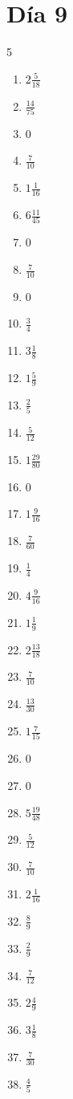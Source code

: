 \documentclass[12pt]{article}
\begin{document}
\section*{Día 9}
\begin{multicols}{5}\begin{enumerate}
\item $ 2 \frac{5}{18} $
\item $ \frac{14}{75} $
\item $ 0 $
\item $ \frac{7}{10} $
\item $ 1 \frac{1}{16} $
\item $ 6 \frac{11}{45} $
\item $ 0 $
\item $ \frac{7}{10} $
\item $ 0 $
\item $ \frac{3}{4} $
\item $ 3 \frac{1}{8} $
\item $ 1 \frac{5}{9} $
\item $ \frac{2}{5} $
\item $ \frac{5}{12} $
\item $ 1 \frac{29}{80} $
\item $ 0 $
\item $ 1 \frac{9}{16} $
\item $ \frac{7}{60} $
\item $ \frac{1}{4} $
\item $ 4 \frac{9}{16} $
\item $ 1 \frac{1}{9} $
\item $ 2 \frac{13}{18} $
\item $ \frac{7}{10} $
\item $ \frac{13}{30} $
\item $ 1 \frac{7}{15} $
\item $ 0 $
\item $ 0 $
\item $ 5 \frac{19}{48} $
\item $ \frac{5}{12} $
\item $ \frac{7}{10} $
\item $ 2 \frac{1}{16} $
\item $ \frac{8}{9} $
\item $ \frac{2}{9} $
\item $ \frac{7}{12} $
\item $ 2 \frac{4}{9} $
\item $ 3 \frac{1}{8} $
\item $ \frac{7}{30} $
\item $ \frac{4}{5} $

\end{enumerate}
\end{multicols}
\end{document}
